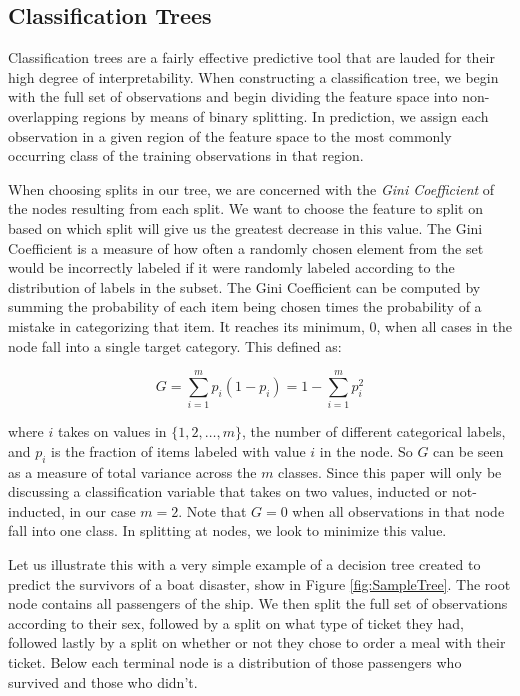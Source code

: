 \documentclass[preprint,12pt]{elsarticle}
\begin{document}
\subsection{Classification Trees}
Classification trees are a fairly effective predictive tool that are lauded for their high degree of interpretability. When constructing a classification tree, we begin with the full set of observations and begin dividing the feature space into non-overlapping regions by means of binary splitting. In prediction, we assign each observation in a given region of the feature space to the most commonly occurring class of the training observations in that region. 

When choosing splits in our tree, we are concerned with the \textit{Gini Coefficient} of the nodes resulting from each split. We want to choose the feature to split on based on which split will give us the greatest decrease in this value. The Gini Coefficient is a measure of how often a randomly chosen element from the set would be incorrectly labeled if it were randomly labeled according to the distribution of labels in the subset. The Gini Coefficient can be computed by summing the probability of each item being chosen times the probability of a mistake in categorizing that item. It reaches its minimum, $0$, when all cases in the node fall into a single target category. This defined as:

$$G = \sum\limits_{i=1}^m p_{i}(1-p_{i}) = 1 - \sum\limits_{i=1}^m p_{i}^{2}$$

\noindent where $i$ takes on values in $\{1,2,\ldots,m\}$, the number of different categorical labels, and $p_i$ is the fraction of items labeled with value $i$ in the node. So $G$ can be seen as a measure of total variance across the $m$ classes. Since this paper will only be discussing a classification variable that takes on two values, inducted or not-inducted, in our case $m=2$. Note that $G = 0$ when all observations in that node fall into one class. In splitting at nodes, we look to minimize this value.

Let us illustrate this with a very simple example of a decision tree created to predict the survivors of a boat disaster, show in Figure \ref{fig:SampleTree}. The root node contains all passengers of the ship. We then split the full set of observations according to their sex, followed by a split on what type of ticket they had, followed lastly by a split on whether or not they chose to order a meal with their ticket. Below each terminal node is a distribution of those passengers who survived and those who didn't. 
\end{document}
